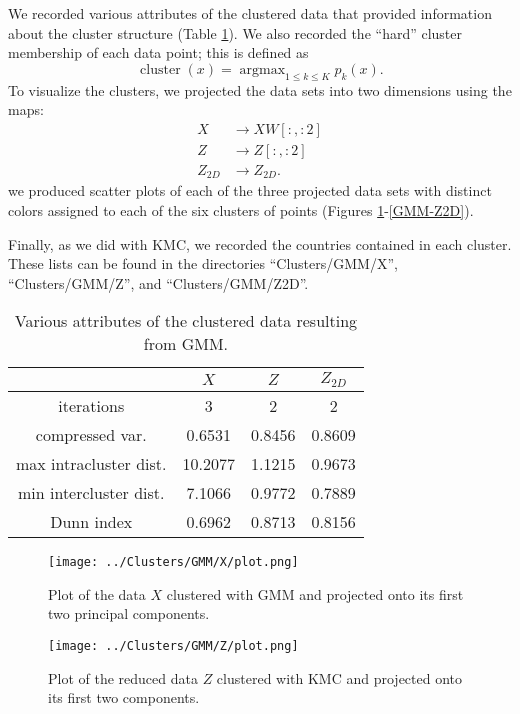 \documentclass[12pt]{article}
\newcommand{\argmax}{\operatorname{argmax}}
\begin{document}
We recorded various attributes of the clustered data that provided information about the cluster structure (Table \ref{GMM-table}). We also recorded the ``hard'' cluster membership of each data point; this is defined as
\[ \operatorname{cluster}(x) = \argmax_{1\leq k\leq K} p_k(x). \]
To visualize the clusters, we projected the data sets into two dimensions using the maps:
\begin{align*}
X &\rightarrow X W[:, :2] \\
Z &\rightarrow Z[:, :2] \\
Z_{2D} &\rightarrow Z_{2D}.
\end{align*}
we produced scatter plots of each of the three projected data sets with distinct colors assigned to each of the six clusters of points (Figures \ref{GMM-X}-\ref{GMM-Z2D}).

Finally, as we did with KMC, we recorded the countries contained in each cluster. These lists can be found in the directories ``Clusters/GMM/X'', ``Clusters/GMM/Z'', and ``Clusters/GMM/Z2D''.

\begin{table}
\centering
\begin{tabular}{|c|c|c|c|} \hline
\quad & $X$ & $Z$ & $Z_{2D}$ \\ \hline
iterations & 3 & 2 & 2 \\ \hline
compressed var. & 0.6531 & 0.8456 & 0.8609 \\ \hline
max intracluster dist. & 10.2077 & 1.1215 & 0.9673 \\ \hline
min intercluster dist. & 7.1066 & 0.9772 & 0.7889 \\ \hline
Dunn index & 0.6962 & 0.8713 & 0.8156 \\ \hline
\end{tabular}
\caption{\label{GMM-table} Various attributes of the clustered data resulting from GMM.}
\end{table}

\begin{figure}
\centering
\texttt{[image: ../Clusters/GMM/X/plot.png]}
\caption{\label{GMM-X} Plot of the data $X$ clustered with GMM and projected onto its first two principal components.}
\end{figure}

\begin{figure}
\centering
\texttt{[image: ../Clusters/GMM/Z/plot.png]}
\caption{\label{GMM-Z} Plot of the reduced data $Z$ clustered with KMC and projected onto its first two components.}
\end{figure}
\end{document}
